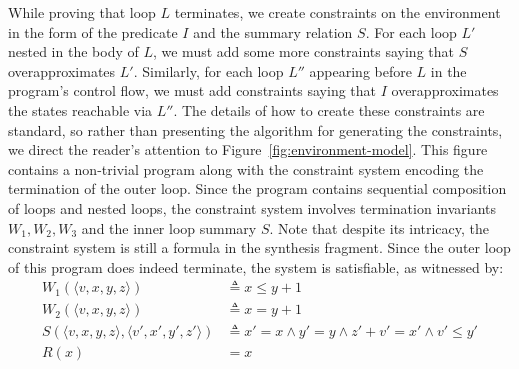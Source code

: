 \documentclass[preprint]{sigplanconf}
\theoremstyle{definition}
\begin{document}
While proving that loop $L$ terminates, we create constraints on the environment in the
form of the predicate $I$ and the summary relation $S$.  For each loop $L'$ nested in the body
of $L$, we must add some more constraints saying that $S$ overapproximates $L'$.
Similarly, for each loop $L''$ appearing before $L$ in the program's control flow, we
must add constraints saying that $I$ overapproximates the states reachable via $L''$.
The details of how to create these constraints are standard, so
rather than presenting the algorithm for generating the constraints, we direct the
reader's attention to Figure~\ref{fig:environment-model}.  This figure contains a non-trivial program
along with the constraint system
encoding the termination of the outer loop.  Since the program contains sequential composition
of loops and nested loops, the constraint
system involves termination invariants $W_1, W_2, W_3$ and the inner loop summary $S$.
Note that despite its intricacy, the constraint system is still a formula in the synthesis fragment.
Since the outer loop of this program does indeed terminate, the system is satisfiable, as witnessed by:
\begin{align*}
W_1(\langle v, x, y, z \rangle ) & \triangleq x \leq y + 1 \\
W_2(\langle v, x, y, z \rangle ) & \triangleq x = y + 1 \\
S(\langle v, x, y, z \rangle, \langle v', x', y', z' \rangle) & \triangleq x ' = x \wedge y' = y \wedge z' + v' = x' \wedge v' \leq y' \\
R(x) & = x
\end{align*}
\end{document}
